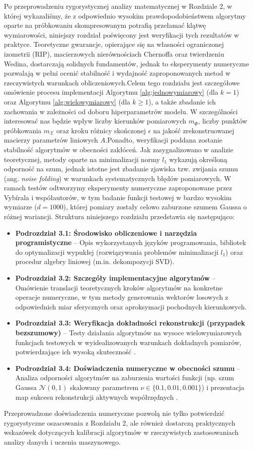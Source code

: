 

Po przeprowadzeniu rygorystycznej analizy matematycznej w Rozdziale 2, w której wykazaliśmy, że z odpowiednio wysokim prawdopodobieństwem algorytmy oparte na próbkowaniu skompresowanym potrafią przełamać klątwę wymiarowości, niniejszy rozdział poświęcony jest weryfikacji tych rezultatów w praktyce.
Teoretyczne gwarancje, opierające się na własności ograniczonej izometrii (RIP), macierzowych nierównościach Chernoffa oraz twierdzeniu Wedina, dostarczają solidnych fundamentów, jednak to eksperymenty numeryczne pozwalają w pełni ocenić stabilność i wydajność zaproponowanych metod w rzeczywistych warunkach obliczeniowych.Celem tego rozdziału jest szczegółowe omówienie procesu implementacji Algorytmu \ref{alg:jednowymiarowy} (dla $k=1$) oraz Algorytmu \ref{alg:wielowymiarowy} (dla $k \ge 1$), a także zbadanie ich zachowania w zależności od doboru hiperparametrów modelu.
W szczególności interesować nas będzie wpływ liczby kierunków pomiarowych $m_\Phi$, liczby punktów próbkowania $m_\mathcal{X}$ oraz kroku różnicy skończonej $\epsilon$ na jakość zrekonstruowanej macierzy parametrów liniowych $A$.Ponadto, weryfikacji poddana zostanie stabilność algorytmów w obecności zakłóceń.
Jak zasygnalizowano w analizie teoretycznej, metody oparte na minimalizacji normy $l_1$ wykazują określoną odporność na szum, jednak istotne jest zbadanie zjawiska tzw. zwijania szumu (ang. \textit{noise folding}) w warunkach systematycznych błędów pomiarowych.
W ramach testów odtworzymy eksperymenty numeryczne zaproponowane przez Vybírala i współautorów, w tym badanie funkcji testowej w bardzo wysokim wymiarze ($d=1000$), której pomiary zostały celowo zaburzone szumem Gaussa o różnej wariancji. Struktura niniejszego rozdziału przedstawia się następująco:
\begin{itemize}
\item \textbf{Podrozdział 3.1: Środowisko obliczeniowe i narzędzia programistyczne} -- Opis wykorzystanych języków programowania, bibliotek do optymalizacji wypukłej (rozwiązywania problemów minimalizacji $l_1$) oraz procedur algebry liniowej (m.in. dekompozycji SVD).
\item \textbf{Podrozdział 3.2: Szczegóły implementacyjne algorytmów} -- Omówienie translacji teoretycznych kroków algorytmów na konkretne operacje numeryczne, w tym metody generowania wektorów losowych z odpowiednich miar sferycznych oraz aproksymacji pochodnych kierunkowych.
\item \textbf{Podrozdział 3.3: Weryfikacja dokładności rekonstrukcji (przypadek bezszumowy)} -- Testy działania algorytmów na wysoce wielowymiarowych funkcjach testowych w wyidealizowanych warunkach dokładnych pomiarów, potwierdzające ich wysoką skuteczność .
\item \textbf{Podrozdział 3.4: Doświadczenia numeryczne w obecności szumu} -- Analiza odporności algorytmów na zaburzenia wartości funkcji (np. szum Gaussa $\mathcal{N}(0,1)$ skalowany parametrem $\nu \in \{0.1, 0.01, 0.001\}$) i prezentacja map sukcesu rekonstrukcji aktywnych współrzędnych .
\end{itemize}
Przeprowadzone doświadczenia numeryczne pozwolą nie tylko potwierdzić rygorystyczne oszacowania z Rozdziału 2, ale również dostarczą praktycznych wskazówek dotyczących kalibracji algorytmów w rzeczywistych zastosowaniach analizy danych i uczenia maszynowego.